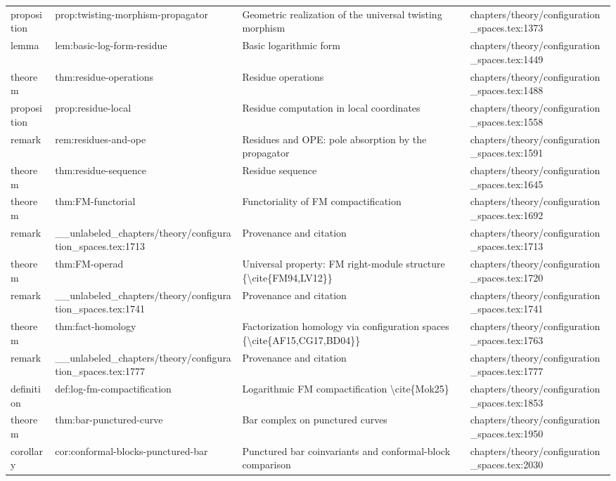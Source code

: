 \documentclass[11pt]{article}
\begin{document}
\begin{longtable}{L{0.10\textwidth}L{0.26\textwidth}L{0.42\textwidth}L{0.22\textwidth}}
proposition & prop:twisting-morphism-propagator & Geometric realization of the universal twisting morphism & chapters/theory/configuration\_spaces.tex:1373\\
lemma & lem:basic-log-form-residue & Basic logarithmic form & chapters/theory/configuration\_spaces.tex:1449\\
theorem & thm:residue-operations & Residue operations & chapters/theory/configuration\_spaces.tex:1488\\
proposition & prop:residue-local & Residue computation in local coordinates & chapters/theory/configuration\_spaces.tex:1558\\
remark & rem:residues-and-ope & Residues and OPE: pole absorption by the propagator & chapters/theory/configuration\_spaces.tex:1591\\
theorem & thm:residue-sequence & Residue sequence & chapters/theory/configuration\_spaces.tex:1645\\
theorem & thm:FM-functorial & Functoriality of FM compactification & chapters/theory/configuration\_spaces.tex:1692\\
remark & \_\_unlabeled\_chapters/theory/configuration\_spaces.tex:1713 & Provenance and citation & chapters/theory/configuration\_spaces.tex:1713\\
theorem & thm:FM-operad & Universal property: FM right-module structure \{\textbackslash{}cite\{FM94,LV12\}\} & chapters/theory/configuration\_spaces.tex:1720\\
remark & \_\_unlabeled\_chapters/theory/configuration\_spaces.tex:1741 & Provenance and citation & chapters/theory/configuration\_spaces.tex:1741\\
theorem & thm:fact-homology & Factorization homology via configuration spaces \{\textbackslash{}cite\{AF15,CG17,BD04\}\} & chapters/theory/configuration\_spaces.tex:1763\\
remark & \_\_unlabeled\_chapters/theory/configuration\_spaces.tex:1777 & Provenance and citation & chapters/theory/configuration\_spaces.tex:1777\\
definition & def:log-fm-compactification & Logarithmic FM compactification \textbackslash{}cite\{Mok25\} & chapters/theory/configuration\_spaces.tex:1853\\
theorem & thm:bar-punctured-curve & Bar complex on punctured curves & chapters/theory/configuration\_spaces.tex:1950\\
corollary & cor:conformal-blocks-punctured-bar & Punctured bar coinvariants and conformal-block comparison & chapters/theory/configuration\_spaces.tex:2030\\

\end{longtable}
\end{document}
